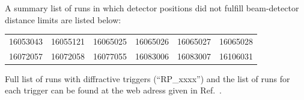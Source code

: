 A summary list of runs in which detector positions did not fulfill beam-detector distance limits are listed below:%
%
\begin{center}
\begin{tabular}{llllll}
16053043 & 16055121 & 16065025 & 16065026 & 16065027 & 16065028\\
16072057 & 16072058 & 16077055 & 16083006 & 16083007 & 16106031\\
\end{tabular}
\end{center}%
%
Full list of runs with diffractive triggers (``RP\_xxxx'') and the list of runs for each trigger can be found at the web adress given in Ref.~\cite{onlineRpTriggersMonitoring}.
